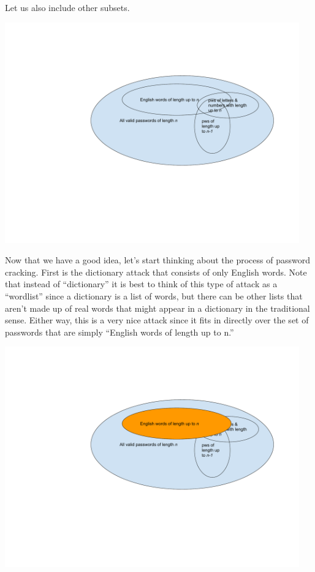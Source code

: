 Let us also include other subsets.

\includegraphics[width=5in]{Assignments/images/PasswordCracking_3}

Now that we have a good idea, let’s start thinking about the process of password cracking. First is the dictionary attack that consists of only English words. Note that instead of “dictionary” it is best to think of this type of attack as a “wordlist” since a dictionary is a list of words, but there can be other lists that aren’t made up of real words that might appear in a dictionary in the traditional sense. Either way, this is a very nice attack since it fits in directly over the set of passwords that are simply “English words of length up to n.”

\includegraphics[width=5in]{Assignments/images/PasswordCracking_4}

